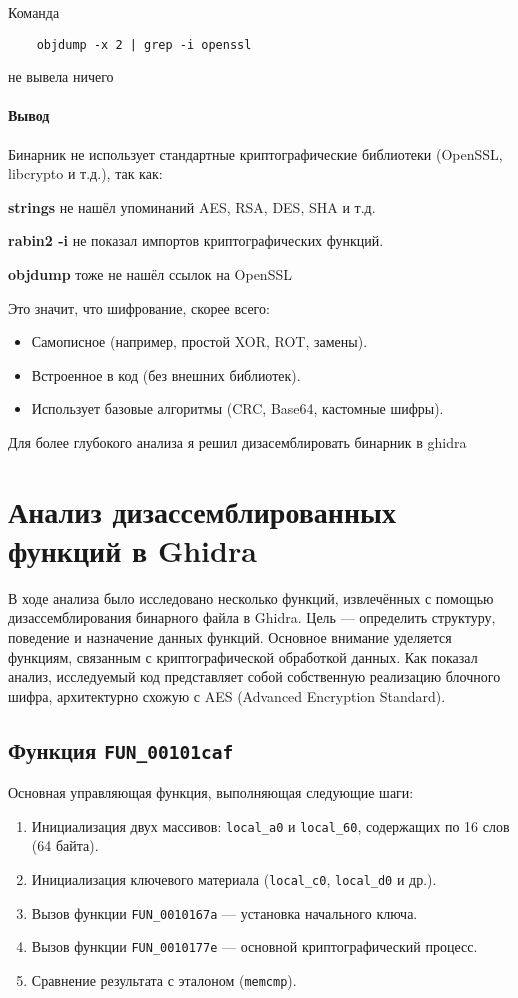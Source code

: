     Команда
    \begin{verbatim}
    objdump -x 2 | grep -i openssl
    \end{verbatim}
    не вывела ничего

    \paragraph{Вывод}
    Бинарник не использует стандартные криптографические библиотеки (OpenSSL, libcrypto и т.д.), так как:

    \textbf{strings} не нашёл упоминаний AES, RSA, DES, SHA и т.д.

    \textbf{rabin2 -i} не показал импортов криптографических функций.

    \textbf{objdump} тоже не нашёл ссылок на OpenSSL

    Это значит, что шифрование, скорее всего:
    \begin{itemize}
        \item Самописное (например, простой XOR, ROT, замены).
        \item Встроенное в код (без внешних библиотек).
        \item Использует базовые алгоритмы (CRC, Base64, кастомные шифры).
    \end{itemize}

    Для более глубокого анализа я решил дизасемблировать бинарник в ghidra


    \section{Анализ дизассемблированных функций в Ghidra}

    В ходе анализа было исследовано несколько функций, извлечённых с помощью дизассемблирования бинарного файла в Ghidra.
    Цель — определить структуру, поведение и назначение данных функций.
    Основное внимание уделяется функциям, связанным с криптографической обработкой данных.
    Как показал анализ, исследуемый код представляет собой собственную реализацию блочного шифра, архитектурно схожую с AES (Advanced Encryption Standard).

    \subsection{Функция \texttt{FUN\_00101caf}}

    Основная управляющая функция, выполняющая следующие шаги:
    \begin{enumerate}
        \item Инициализация двух массивов: \texttt{local\_a0} и \texttt{local\_60}, содержащих по 16 слов (64 байта).
        \item Инициализация ключевого материала (\texttt{local\_c0}, \texttt{local\_d0} и др.).
        \item Вызов функции \texttt{FUN\_0010167a} — установка начального ключа.
        \item Вызов функции \texttt{FUN\_0010177e} — основной криптографический процесс.
        \item Сравнение результата с эталоном (\texttt{memcmp}).
    \end{enumerate}

